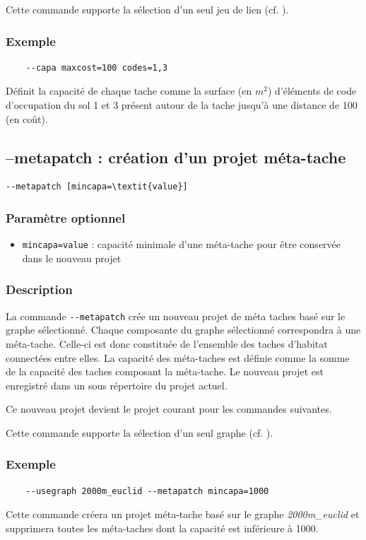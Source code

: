 \documentclass[a4paper,10pt]{report}
\begin{document}
Cette commande supporte la sélection d'un seul jeu de lien (cf. ).

\subsubsection{Exemple}
\begin{Verbatim}
	--capa maxcost=100 codes=1,3
\end{Verbatim}
Définit la capacité de chaque tache comme la surface (en $m^2$) d'éléments de code d'occupation du sol 1 et 3 présent autour de la tache jusqu'à une distance de 100 (en coût). 


\subsection{--metapatch : création d'un projet méta-tache}
\begin{Verbatim}[commandchars=\\\{\}]
--metapatch [mincapa=\textit{value}]
\end{Verbatim}

\subsubsection{Paramètre optionnel}
\begin{itemize}
	\item \verb|mincapa=value| : capacité minimale d'une méta-tache pour être conservée dans le nouveau projet
\end{itemize}

\subsubsection{Description}
La commande \verb|--metapatch| crée un nouveau projet de méta taches basé sur le graphe sélectionné. 
Chaque composante du graphe sélectionné correspondra à une méta-tache. Celle-ci est donc constituée de l’ensemble des taches d’habitat connectées entre elles.
La capacité des méta-taches est définie comme la somme de la capacité des taches composant la méta-tache. Le nouveau projet est enregistré dans un sous répertoire du projet actuel.

Ce nouveau projet devient le projet courant pour les commandes suivantes.

Cette commande supporte la sélection d'un seul graphe (cf. ).

\subsubsection{Exemple}
\begin{Verbatim}
	--usegraph 2000m_euclid --metapatch mincapa=1000
\end{Verbatim}
Cette commande créera un projet méta-tache basé sur le graphe \textit{2000m\_euclid} et supprimera toutes les méta-taches dont la capacité est inférieure à 1000.
\end{document}
